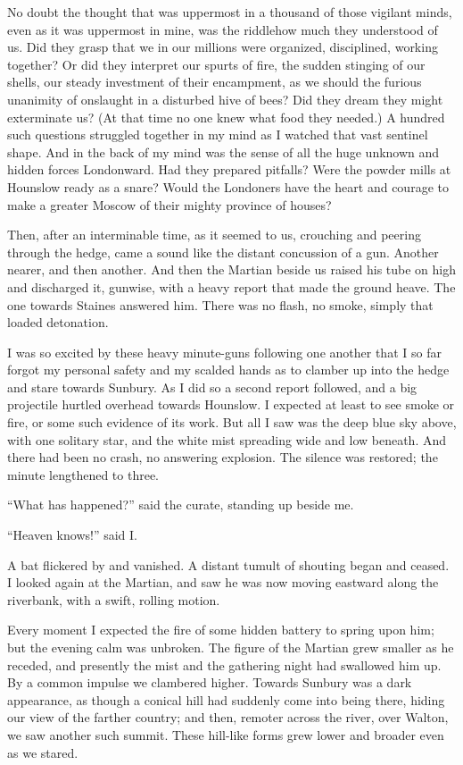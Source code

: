 No doubt the thought that was uppermost in a thousand of those
vigilant minds, even as it was uppermost in mine, was the
riddle\dash{}how much they understood of us. Did they grasp that we in
our millions were organized, disciplined, working together? Or did
they interpret our spurts of fire, the sudden stinging of our
shells, our steady investment of their encampment, as we should the
furious unanimity of onslaught in a disturbed hive of bees? Did
they dream they might exterminate us? (At that time no one knew
what food they needed.) A hundred such questions struggled together
in my mind as I watched that vast sentinel shape. And in the back
of my mind was the sense of all the huge unknown and hidden forces
Londonward. Had they prepared pitfalls? Were the powder mills at
Hounslow ready as a snare? Would the Londoners have the heart and
courage to make a greater Moscow of their mighty province of
houses?

Then, after an interminable time, as it seemed to us, crouching and
peering through the hedge, came a sound like the distant concussion
of a gun. Another nearer, and then another. And then the Martian
beside us raised his tube on high and discharged it, gunwise, with
a heavy report that made the ground heave. The one towards Staines
answered him. There was no flash, no smoke, simply that loaded
detonation.

I was so excited by these heavy minute-guns following one another
that I so far forgot my personal safety and my scalded hands as to
clamber up into the hedge and stare towards Sunbury. As I did so a
second report followed, and a big projectile hurtled overhead
towards Hounslow. I expected at least to see smoke or fire, or some
such evidence of its work. But all I saw was the deep blue sky
above, with one solitary star, and the white mist spreading wide
and low beneath. And there had been no crash, no answering
explosion. The silence was restored; the minute lengthened to
three.

``What has happened?'' said the curate, standing up beside me.

``Heaven knows!'' said I.

A bat flickered by and vanished. A distant tumult of shouting began
and ceased. I looked again at the Martian, and saw he was now
moving eastward along the riverbank, with a swift, rolling motion.

Every moment I expected the fire of some hidden battery to spring
upon him; but the evening calm was unbroken. The figure of the
Martian grew smaller as he receded, and presently the mist and the
gathering night had swallowed him up. By a common impulse we
clambered higher. Towards Sunbury was a dark appearance, as though
a conical hill had suddenly come into being there, hiding our view
of the farther country; and then, remoter across the river, over
Walton, we saw another such summit. These hill-like forms grew
lower and broader even as we stared.

